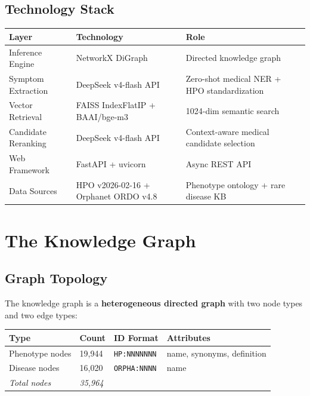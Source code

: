 \documentclass[11pt,a4paper]{article}
\begin{document}
\subsection{Technology Stack}

\begin{table}[H]
\centering
\begin{tabular}{@{}lll@{}}
\toprule
\textbf{Layer} & \textbf{Technology} & \textbf{Role} \\
\midrule
Inference Engine & NetworkX DiGraph & Directed knowledge graph \\
Symptom Extraction & DeepSeek v4-flash API & Zero-shot medical NER + HPO standardization \\
Vector Retrieval & FAISS IndexFlatIP + BAAI/bge-m3 & 1024-dim semantic search \\
Candidate Reranking & DeepSeek v4-flash API & Context-aware medical candidate selection \\
Web Framework & FastAPI + uvicorn & Async REST API \\
Data Sources & HPO v2026-02-16 + Orphanet ORDO v4.8 & Phenotype ontology + rare disease KB \\
\bottomrule
\end{tabular}
\end{table}

\newpage

\section{The Knowledge Graph}

\subsection{Graph Topology}

The knowledge graph is a \textbf{heterogeneous directed graph} with two node types and two edge types:

\begin{table}[H]
\centering
\begin{tabular}{@{}llll@{}}
\toprule
\textbf{Type} & \textbf{Count} & \textbf{ID Format} & \textbf{Attributes} \\
\midrule
Phenotype nodes & 19,944 & \texttt{HP:NNNNNNN} & name, synonyms, definition \\
Disease nodes   & 16,020 & \texttt{ORPHA:NNNN} & name \\
\midrule
\textit{Total nodes} & \textit{35,964} & & \\
\bottomrule
\end{tabular}
\end{table}
\end{document}
